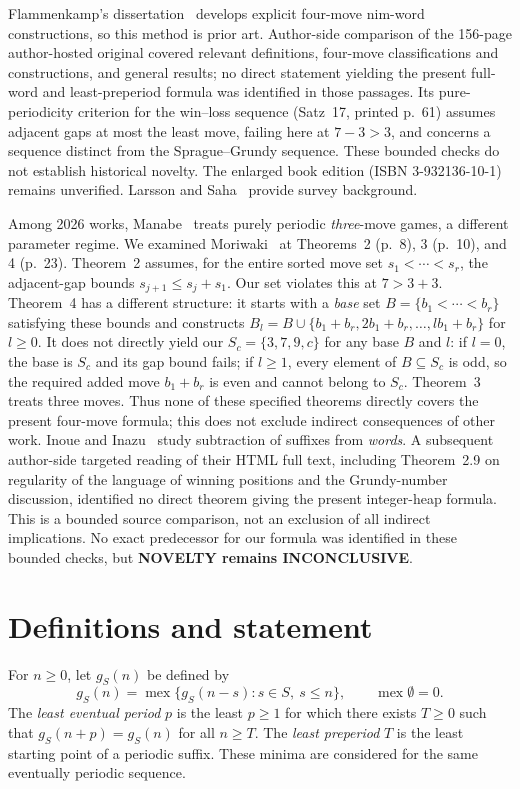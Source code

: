 \documentclass[10pt,a4paper]{article}
\newcommand{\mex}{\operatorname{mex}}
\begin{document}
Flammenkamp's dissertation~\cite{Flammenkamp1997} develops explicit four-move nim-word constructions, so this method is prior art. Author-side comparison of the 156-page author-hosted original covered relevant definitions, four-move classifications and constructions, and general results; no direct statement yielding the present full-word and least-preperiod formula was identified in those passages. Its pure-periodicity criterion for the win--loss sequence (Satz~17, printed p.~61) assumes adjacent gaps at most the least move, failing here at $7-3>3$, and concerns a sequence distinct from the Sprague--Grundy sequence. These bounded checks do not establish historical novelty. The enlarged book edition (ISBN 3-932136-10-1) remains unverified. Larsson and Saha~\cite{LarssonSaha2025} provide survey background.

Among 2026 works, Manabe~\cite{Manabe2026} treats purely periodic \emph{three}-move games, a different parameter regime. We examined Moriwaki~\cite{Moriwaki2026} at Theorems~2 (p.~8), 3 (p.~10), and 4 (p.~23). Theorem~2 assumes, for the entire sorted move set $s_1<\cdots<s_r$, the adjacent-gap bounds $s_{j+1}\le s_j+s_1$. Our set violates this at $7>3+3$. Theorem~4 has a different structure: it starts with a \emph{base} set $B=\{b_1<\cdots<b_r\}$ satisfying these bounds and constructs $B_l=B\cup\{b_1+b_r,2b_1+b_r,\ldots,lb_1+b_r\}$ for $l\ge0$. It does not directly yield our $S_c=\{3,7,9,c\}$ for any base $B$ and $l$: if $l=0$, the base is $S_c$ and its gap bound fails; if $l\ge1$, every element of $B\subseteq S_c$ is odd, so the required added move $b_1+b_r$ is even and cannot belong to $S_c$. Theorem~3 treats three moves. Thus none of these specified theorems directly covers the present four-move formula; this does not exclude indirect consequences of other work. Inoue and Inazu~\cite{InoueInazu2026} study subtraction of suffixes from \emph{words}. A subsequent author-side targeted reading of their HTML full text, including Theorem~2.9 on regularity of the language of winning positions and the Grundy-number discussion, identified no direct theorem giving the present integer-heap formula. This is a bounded source comparison, not an exclusion of all indirect implications. No exact predecessor for our formula was identified in these bounded checks, but \textbf{NOVELTY remains INCONCLUSIVE}.

\section{Definitions and statement}
For $n\ge0$, let $g_S(n)$ be defined by
\begin{equation}\label{eq:mex}
 g_S(n)=\mex\{g_S(n-s):s\in S,\ s\le n\},\qquad\mex\emptyset=0.
\end{equation}
The \emph{least eventual period} $p$ is the least $p\ge1$ for which there exists $T\ge0$ such that $g_S(n+p)=g_S(n)$ for all $n\ge T$. The \emph{least preperiod} $T$ is the least starting point of a periodic suffix. These minima are considered for the same eventually periodic sequence.
\end{document}
